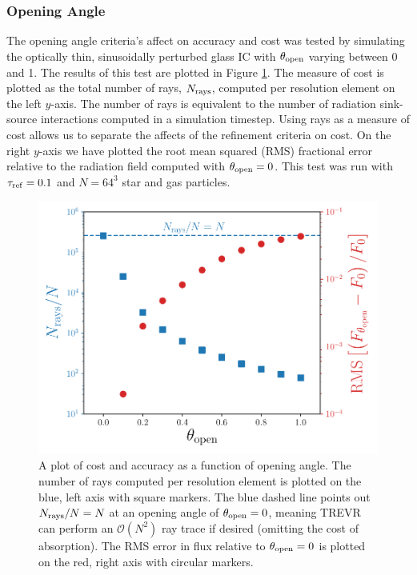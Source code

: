 \documentclass[fleq,usenatbib]{mnras}
\newcommand{\acro}{TREVR}
\newcommand{\bigO}[1]{\mathcal{O}\left(#1\right)}
\newcommand{\tr}{\tau_{\rm ref}}
\newcommand{\tO}{\theta_{\rm open}}
\begin{document}
\subsubsection{Opening Angle}
The opening angle criteria's affect on accuracy and cost was tested by 
simulating the optically thin, sinusoidally perturbed glass IC with $\tO$ 
varying between 0 and 1. The results of this test are plotted in Figure 
\ref{fig:openangle}. The measure of cost is plotted as the total number of 
rays, $N_{\rm rays}$, computed per resolution element on the left $y$-axis. 
The number of rays is equivalent to the number of radiation sink-source 
interactions computed in a simulation timestep. Using rays as a measure of 
cost allows us to separate the affects of the refinement criteria on cost. On 
the right $y$-axis we have plotted the root mean squared (RMS) fractional 
error relative to the radiation field computed with $\tO=0$. This test was run 
with $\tr = 0.1$ and $N=64^3$ star and gas particles.
\begin{figure}
\includegraphics[width=1\linewidth]{Figures/opening_angle.pdf}
\caption{A plot of cost and accuracy as a function of opening angle. The 
number of rays computed per resolution element is plotted on the blue, 
left axis with square markers. The blue dashed line points out $N_{\rm rays}/N 
= N$ at an opening angle of $\tO=0$, meaning \acro{} can perform an 
$\bigO{N^2}$ ray trace if desired (omitting the cost of absorption). The RMS 
error in flux relative to $\tO=0$ is plotted on the red, right axis with 
circular markers.}
\label{fig:openangle}
\end{figure}
\end{document}
